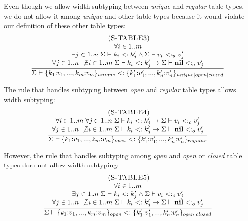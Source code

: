 Even though we allow width subtyping between \emph{unique} and \emph{regular}
table types, we do not allow it among \emph{unique} and other table types
because it would violate our definition of these other table types:
\[
\begin{array}{c}
\; (\textsc{S-TABLE3})\\
\dfrac{\begin{array}{c}
       \forall i \in 1..m \\
       \exists j \in 1..n \;
       \Sigma \vdash k_{i} <: k_{j}' \land \Sigma \vdash v_{i} <:_{u} v_{j}' \\
       \forall j \in 1..n \; \not\exists i \in 1..m \;
       \Sigma \vdash k_{i} <: k_{j}' \to \Sigma \vdash \mathbf{nil} <:_{o} v_{j}'
       \end{array}}
      {\Sigma \vdash \{k_{1}{:}v_{1}, ..., k_{m}{:}v_{m}\}_{unique} <:
                    \{k_{1}'{:}v_{1}', ..., k_{n}'{:}v_{n}'\}_{unique|open|closed}}
\end{array}
\]

The rule that handles subtyping between \emph{open} and \emph{regular} table
types allows width subtyping:
\[
\begin{array}{c}
\; (\textsc{S-TABLE4})\\
\dfrac{\begin{array}{c}
       \forall i \in 1..m \; \forall j \in 1..n \;
       \Sigma \vdash k_{i} <: k_{j}' \to \Sigma \vdash v_{i} <:_{c} v_{j}' \\
       \forall j \in 1..n \; \not\exists i \in 1..m \;
       \Sigma \vdash k_{i} <: k_{j}' \to \Sigma \vdash \mathbf{nil} <:_{o} v_{j}'
       \end{array}}
      {\Sigma \vdash \{k_{1}{:}v_{1}, ..., k_{m}{:}v_{m}\}_{open} <:
                    \{k_{1}'{:}v_{1}', ..., k_{n}'{:}v_{n}'\}_{regular}}
\end{array}
\]

However, the rule that handles subtyping among \emph{open} and
\emph{open} or \emph{closed} table types does not allow width subtyping:
\[
\begin{array}{c}
\; (\textsc{S-TABLE5})\\
\dfrac{\begin{array}{c}
       \forall i \in 1..m \\
       \exists j \in 1..n \;
       \Sigma \vdash k_{i} <: k_{j}' \land \Sigma \vdash v_{i} <:_{c} v_{j}' \\
       \forall j \in 1..n \; \not\exists i \in 1..m \;
       \Sigma \vdash k_{i} <: k_{j}' \to \Sigma \vdash \mathbf{nil} <:_{o} v_{j}'
       \end{array}}
      {\Sigma \vdash \{k_{1}{:}v_{1}, ..., k_{m}{:}v_{m}\}_{open} <:
                    \{k_{1}'{:}v_{1}', ..., k_{n}'{:}v_{n}'\}_{open|closed}}
\end{array}
\]

